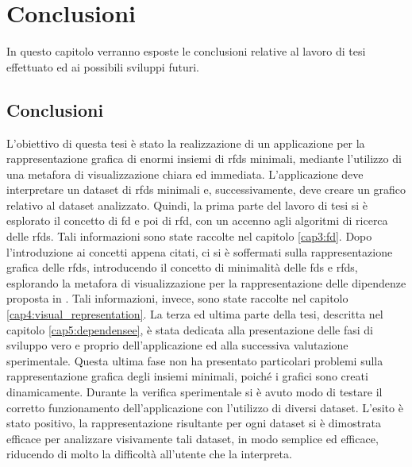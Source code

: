 \chapter{Conclusioni} %
%
In questo capitolo verranno esposte le conclusioni relative al lavoro di tesi effettuato ed ai possibili sviluppi futuri.

\section{Conclusioni}
L'obiettivo di questa tesi \`{e} stato la realizzazione di un applicazione per la rappresentazione grafica di enormi insiemi di \acrlong{rfds} minimali, mediante l'utilizzo di una metafora di visualizzazione chiara ed immediata. L'applicazione deve interpretare un dataset di \acrshort{rfds} minimali e, successivamente, deve creare un grafico relativo al dataset analizzato. Quindi, la prima parte del lavoro di tesi si \`{e} esplorato il concetto di \acrlong{fd} e poi di \acrlong{rfd}, con un accenno agli algoritmi di ricerca delle \acrlong{rfds}. Tali informazioni sono state raccolte nel capitolo \ref{cap3:fd}. Dopo l'introduzione ai concetti appena citati, ci si \`{e} soffermati sulla rappresentazione grafica delle \acrlong{rfds}, introducendo il concetto di minimalit\`{a} delle \acrlong{fds} e \acrlong{rfds}, esplorando la metafora di visualizzazione per la rappresentazione delle dipendenze proposta in \cite{mdvisualization}. Tali informazioni, invece, sono state raccolte nel capitolo \ref{cap4:visual_representation}. La terza ed ultima parte della tesi, descritta nel capitolo \ref{cap5:dependensee}, \`{e} stata dedicata alla presentazione delle fasi di sviluppo vero e proprio dell'applicazione ed alla successiva valutazione sperimentale. Questa ultima fase non ha presentato particolari problemi sulla rappresentazione grafica degli insiemi minimali, poich\'{e} i grafici sono creati dinamicamente. Durante la verifica sperimentale si \`{e} avuto modo di testare il corretto funzionamento dell'applicazione con l'utilizzo di diversi dataset. L'esito \`{e} stato positivo, la rappresentazione risultante per ogni dataset si \`{e} dimostrata efficace per analizzare visivamente tali dataset, in modo semplice ed efficace, riducendo di molto la difficolt\`{a} all'utente che la interpreta.

